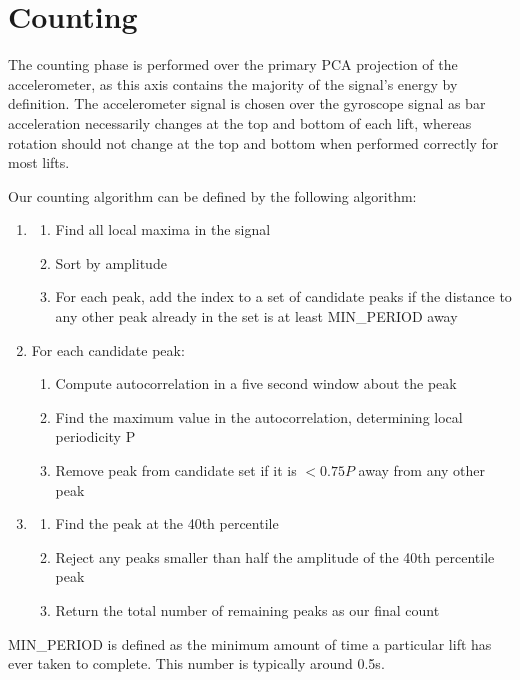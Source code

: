 \section{Counting}

The counting phase is performed over the primary PCA projection of the accelerometer, as this axis contains the majority of the signal's energy by definition. The accelerometer signal is chosen over the gyroscope signal as bar acceleration necessarily changes at the top and bottom of each lift, whereas rotation should not change at the top and bottom when performed correctly for most lifts.

Our counting algorithm can be defined by the following algorithm: 
\begin{enumerate}
    \item 
    \begin{enumerate}
        \item Find all local maxima in the signal
        \item Sort by amplitude
        \item For each peak, add the index to a set of candidate peaks if the distance to any other peak already in the set is at least MIN\_PERIOD away
    \end{enumerate}
    \item For each candidate peak:
    \begin{enumerate}
        \item Compute autocorrelation in a five second window about the peak
        \item Find the maximum value in the autocorrelation, determining local periodicity P
        \item Remove peak from candidate set if it is $<0.75P$ away from any other peak
    \end{enumerate}
    \item 
    \begin{enumerate}
        \item Find the peak at the 40th percentile
        \item Reject any peaks smaller than half the amplitude of the 40th percentile peak
        \item Return the total number of remaining peaks as our final count
    \end{enumerate}
\end{enumerate}

MIN\_PERIOD is defined as the minimum amount of time a particular lift has ever taken to complete. This number is typically around 0.5s. 

